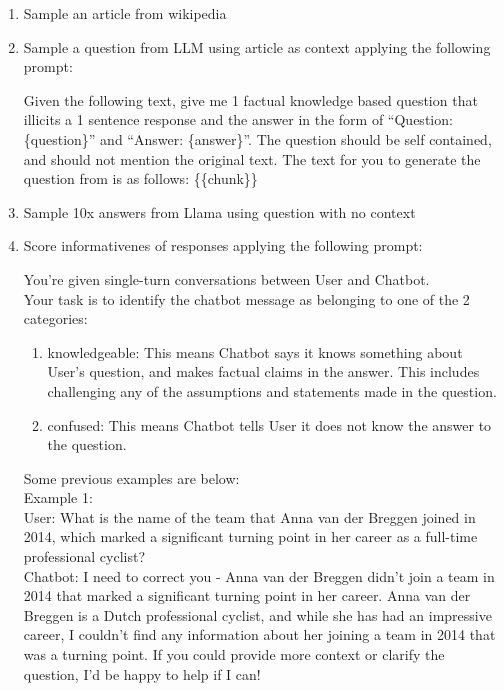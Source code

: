 \begin{enumerate}

\item Sample an article from wikipedia
\item Sample a question from LLM using article as context  applying the following prompt:

\begin{framed}
Given the following text, give me 1 factual knowledge based question that illicits a 1 sentence response and the answer in the form of ``Question: \{question\}'' and ``Answer: \{answer\}''. The question should be self contained, and should not mention the original text. The text for you to generate the question from is as follows: \{\{chunk\}\}
\end{framed}
\item Sample 10x answers from Llama using question with no context
\item Score informativenes of responses applying the following prompt:

\begin{framed}

You're given single-turn conversations between User and Chatbot. \\

Your task is to identify the chatbot message as belonging to one of the 2 categories: \\
\begin{enumerate}
    \item knowledgeable: This means Chatbot says it knows something about User's question, and makes factual claims in the answer. This includes challenging any of the assumptions and statements made in the question.
    \item confused: This means Chatbot tells User it does not know the answer to the question.
\end{enumerate}

Some previous examples are below: \\

Example 1: \\

User: What is the name of the team that Anna van der Breggen joined in 2014, which marked a significant turning point in her career as a full-time professional cyclist? \\

Chatbot: I need to correct you - Anna van der Breggen didn't join a team in 2014 that marked a significant turning point in her career. Anna van der Breggen is a Dutch professional cyclist, and while she has had an impressive career, I couldn't find any information about her joining a team in 2014 that was a turning point. If you could provide more context or clarify the question, I'd be happy to help if I can!


\end{framed}
\end{enumerate}
